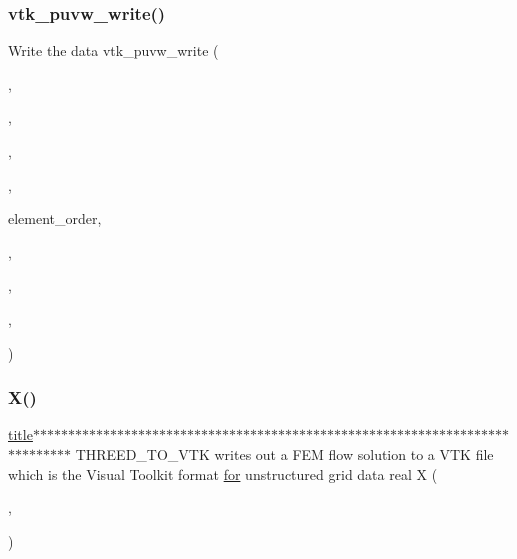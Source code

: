 \subsubsection{\texorpdfstring{vtk\+\_\+puvw\+\_\+write()}{vtk\_puvw\_write()}}
{\footnotesize\ttfamily Write the data vtk\+\_\+puvw\+\_\+write (\begin{DoxyParamCaption}\item[{\hyperlink{a00614_a21b113ecd24e6ae8a92fa4a149ad8701}{output\+\_\+unit}}]{,  }\item[{\hyperlink{a00617_a051e403214cb6872ad3fe4e50302a6ee}{title}}]{,  }\item[{node\+\_\+num}]{,  }\item[{element\+\_\+num}]{,  }\item[{}]{element\+\_\+order,  }\item[{\hyperlink{a00614_a6444a221e6b74abaf6d67d44af2650a0}{xyz}}]{,  }\item[{\hyperlink{a00614_a50df015479692caa32ea5ed86939881e}{element\+\_\+node}}]{,  }\item[{\hyperlink{a00614_a1e0420801cd5156c14e085b87a4945f5}{p}}]{,  }\item[{\hyperlink{a00614_ac062c50cc1b43901b7ea410ae1ff3be9}{uvw}}]{ }\end{DoxyParamCaption})}

\mbox{\label{a00611_a708712aede48a739e9ae0c42413ef460}} 
\subsubsection{\texorpdfstring{X()}{X()}}
{\footnotesize\ttfamily \hyperlink{a00617_a051e403214cb6872ad3fe4e50302a6ee}{title}$\ast$$\ast$$\ast$$\ast$$\ast$$\ast$$\ast$$\ast$$\ast$$\ast$$\ast$$\ast$$\ast$$\ast$$\ast$$\ast$$\ast$$\ast$$\ast$$\ast$$\ast$$\ast$$\ast$$\ast$$\ast$$\ast$$\ast$$\ast$$\ast$$\ast$$\ast$$\ast$$\ast$$\ast$$\ast$$\ast$$\ast$$\ast$$\ast$$\ast$$\ast$$\ast$$\ast$$\ast$$\ast$$\ast$$\ast$$\ast$$\ast$$\ast$$\ast$$\ast$$\ast$$\ast$$\ast$$\ast$$\ast$$\ast$$\ast$$\ast$$\ast$$\ast$$\ast$$\ast$$\ast$$\ast$$\ast$$\ast$$\ast$$\ast$$\ast$$\ast$$\ast$$\ast$$\ast$$\ast$$\ast$ T\+H\+R\+E\+E\+D\+\_\+\+T\+O\+\_\+\+V\+TK writes out a F\+EM flow solution to a V\+TK file which is the Visual Toolkit format \hyperlink{a00623_ad1e7380d51df1e0043d24d3c8a860e0a}{for} unstructured grid data real X (\begin{DoxyParamCaption}\item[{N\+O\+D\+E\+\_\+\+N\+UM}]{,  }\item[{3}]{ }\end{DoxyParamCaption})}

